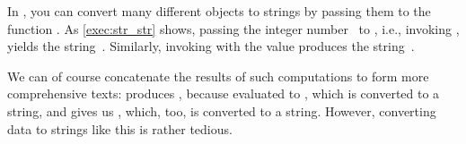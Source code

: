 In \python, you can convert many different objects to strings by passing them to the function .
As \cref{exec:str_str} shows, passing the integer number~ to , i.e., invoking , yields the string~.
Similarly, invoking  with the  value  produces the string~.

We can of course concatenate the results of such computations to form more comprehensive texts:
 produces , because  evaluated to , which is converted to a string, and  gives us , which, too, is converted to a string.
However, converting data to strings like this is rather tedious.

%
%

